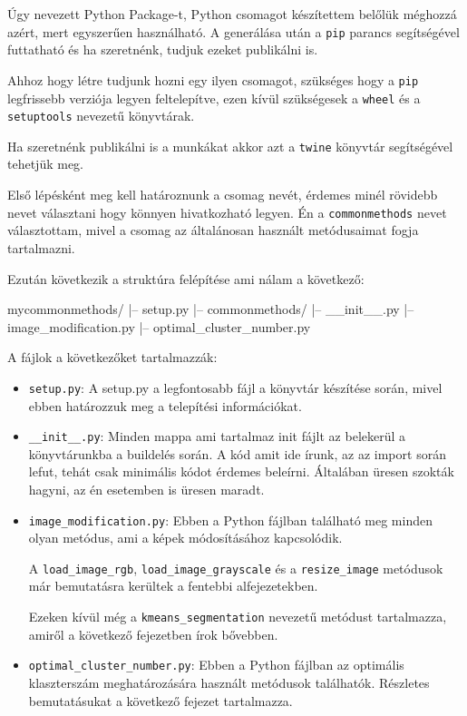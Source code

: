 Úgy nevezett Python Package-t, Python csomagot készítettem belőlük méghozzá azért, mert egyszerűen használható. A generálása után a \texttt{pip} parancs segítségével futtatható és ha szeretnénk, tudjuk ezeket publikálni is. \cite{pythonlibrary}

Ahhoz hogy létre tudjunk hozni egy ilyen csomagot, szükséges hogy a \texttt{pip} legfrissebb verziója legyen feltelepítve, ezen kívül szükségesek a \texttt{wheel} és a \texttt{setuptools} nevezetű könyvtárak.

Ha szeretnénk publikálni is a munkákat akkor azt a \texttt{twine} könyvtár segítségével tehetjük meg.

Első lépésként meg kell határoznunk a csomag nevét, érdemes minél rövidebb nevet választani hogy könnyen hivatkozható legyen. Én a \texttt{commonmethods} nevet választottam, mivel a csomag az általánosan használt metódusaimat fogja tartalmazni.

Ezután következik a struktúra felépítése ami nálam a következő:
\begin{python}
mycommonmethods/
|-- setup.py
|-- commonmethods/
	|-- __init__.py
	|-- image_modification.py
	|-- optimal_cluster_number.py
\end{python}
A fájlok a következőket tartalmazzák:
\begin{itemize}
\item \texttt{setup.py}: A setup.py a legfontosabb fájl a könyvtár készítése során, mivel ebben határozzuk meg a telepítési információkat.
\item \texttt{\_\_init\_\_.py}: Minden mappa ami tartalmaz init fájlt az belekerül a könyvtárunkba a buildelés során. A kód amit ide írunk, az az import során lefut, tehát csak minimális kódot érdemes beleírni. Általában üresen szokták hagyni, az én esetemben is üresen maradt.
\item \texttt{image\_modification.py}: Ebben a Python fájlban található meg minden olyan metódus, ami a képek módosításához kapcsolódik.
 \begin{sloppypar}
 A \texttt{load\_image\_rgb}, \texttt{load\_image\_grayscale} és a \texttt{resize\_image} metódusok már bemutatásra kerültek a fentebbi alfejezetekben.
 \end{sloppypar}
  Ezeken kívül még a \texttt{kmeans\_segmentation} nevezetű metódust tartalmazza, amiről a következő fejezetben írok bővebben.
\item \texttt{optimal\_cluster\_number.py}: Ebben a Python fájlban az optimális klaszterszám meghatározására használt metódusok találhatók. Részletes bemutatásukat a következő fejezet tartalmazza.
\end{itemize}

